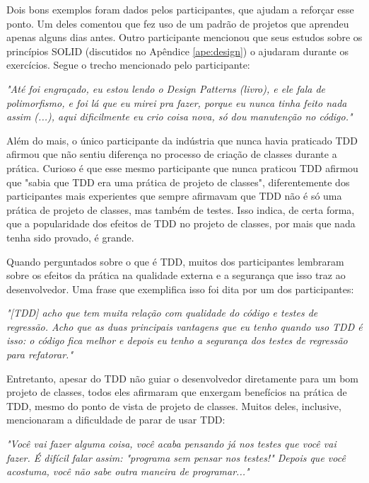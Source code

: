 \documentclass[conference]{IEEEtran}
\begin{document}
Dois bons exemplos foram dados pelos participantes, que ajudam a reforçar esse ponto. Um deles
comentou que fez uso de um padrão de projetos \cite{gof} que aprendeu apenas alguns dias antes.
Outro participante mencionou que seus estudos sobre os princípios SOLID (discutidos no Apêndice \ref{ape:design})
o ajudaram durante os exercícios. Segue o trecho mencionado pelo participante:

\begin{framed}
\textit{"Até foi engraçado, eu estou lendo o Design Patterns (livro), e ele fala de polimorfismo, e foi
lá que eu mirei pra fazer, porque eu nunca tinha feito nada assim (...), aqui dificilmente eu crio
coisa nova, só dou manutenção no código."}
\end{framed}

Além do mais, o único participante da indústria que nunca havia
praticado TDD afirmou que não sentiu diferença no processo de criação de classes durante
a prática.
Curioso é que esse mesmo participante que nunca praticou TDD afirmou que "sabia que TDD era uma prática de projeto de classes",
diferentemente dos participantes mais experientes que sempre afirmavam que TDD não é só uma prática de projeto de classes,
mas também de testes. Isso indica, de certa forma, que a popularidade dos efeitos de TDD no projeto de classes, por mais
que nada tenha sido provado, é grande.

Quando perguntados sobre o que é TDD, muitos dos participantes lembraram sobre
os efeitos da prática na qualidade externa e a segurança que isso traz
ao desenvolvedor.
Uma frase que exemplifica isso foi dita por um dos participantes:

\begin{framed}
\textit{"[TDD] acho que tem muita relação com qualidade do código e testes 
de regressão. Acho que as duas principais vantagens que eu tenho quando uso TDD é isso: o código
fica melhor e depois eu tenho a segurança dos testes de regressão para refatorar."}
\end{framed}

Entretanto, apesar do TDD não guiar o desenvolvedor diretamente para um bom projeto de classes,
todos eles afirmaram que enxergam benefícios na prática de TDD, mesmo do
ponto de vista de projeto de classes. Muitos deles, inclusive, mencionaram a dificuldade
de parar de usar TDD:

\begin{framed}
\textit{"Você vai fazer alguma coisa, você acaba pensando já nos testes que você vai fazer. É difícil 
falar assim: "programa sem pensar nos testes!" Depois que você acostuma, você não sabe outra
maneira de programar..."}
\end{framed}
\end{document}
